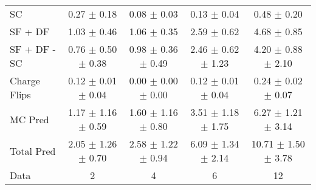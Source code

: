 \begin{tabular}{l|cccc}
                                 SC &  0.27 $\pm$  0.18 &  0.08 $\pm$  0.03 &  0.13 $\pm$  0.04 &  0.48 $\pm$  0.20 \\
                            SF + DF &  1.03 $\pm$  0.46 &  1.06 $\pm$  0.35 &  2.59 $\pm$  0.62 &  4.68 $\pm$  0.85 \\
\hline
                       SF + DF - SC &  0.76 $\pm$  0.50 $\pm$  0.38 &  0.98 $\pm$  0.36 $\pm$  0.49 &  2.46 $\pm$  0.62 $\pm$  1.23 &  4.20 $\pm$  0.88 $\pm$  2.10 \\
\hline\hline
                       Charge Flips &  0.12 $\pm$  0.01 $\pm$  0.04 &  0.00 $\pm$  0.00 $\pm$  0.00 &  0.12 $\pm$  0.01 $\pm$  0.04 &  0.24 $\pm$  0.02 $\pm$  0.07 \\
\hline
                            MC Pred &  1.17 $\pm$  1.16 $\pm$  0.59 &  1.60 $\pm$  1.16 $\pm$  0.80 &  3.51 $\pm$  1.18 $\pm$  1.75 &  6.27 $\pm$  1.21 $\pm$  3.14 \\
\hline
                         Total Pred &  2.05 $\pm$  1.26 $\pm$  0.70 &  2.58 $\pm$  1.22 $\pm$  0.94 &  6.09 $\pm$  1.34 $\pm$  2.14 & 10.71 $\pm$  1.50 $\pm$  3.78 \\
\hline\hline
                               Data &     2 &     4 &     6 &    12 \\
\hline\hline
\end{tabular}

